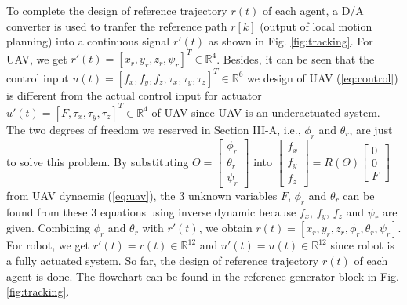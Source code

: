 \documentclass{ieeeaccess}
\begin{document}
To complete the design of reference trajectory $r(t)$ of each agent, a D/A converter is used to tranfer the reference path $r[k]$ (output of local motion planning) into a continuous signal $r'(t)$ as shown in Fig. \ref{fig:tracking}. For UAV, we get $r'(t) = [x_r, y_r, z_r, \psi_r]^T\in\mathbb{R}^{4}$. Besides, it can be seen that the control input $u(t)=[f_x, f_y, f_z, \tau_x, \tau_y, \tau_z]^T\in\mathbb{R}^6$ we design of UAV (\ref{eq:control}) is different from the actual control input for actuator $u'(t)=[F, \tau_x, \tau_y, \tau_z]^T\in\mathbb{R}^4$ of UAV since UAV is an underactuated system. The two degrees of freedom we reserved in Section III-A, i.e., $\phi_r$ and $\theta_r$, are just to solve this problem. By substituting $\Theta=\begin{bmatrix}
    \phi_r \\ \theta_r \\ \psi_r
\end{bmatrix}$ into $\begin{bmatrix}
        f_x \\ f_y \\ f_z
\end{bmatrix} = R(\Theta)\begin{bmatrix}
        0 \\ 0 \\ F
\end{bmatrix} $ from UAV dynacmis (\ref{eq:uav}), the 3 unknown variables $F$, $\phi_r$ and $\theta_r$ can be found from these 3 equations using inverse dynamic because $f_x$, $f_y$, $f_z$ and $\psi_r$ are given. Combining $\phi_r$ and $\theta_r$ with $r'(t)$, we obtain $r(t)= [x_r, y_r, z_r, \phi_r, \theta_r, \psi_r]$. For robot, we get $r'(t)=r(t)\in\mathbb{R}^{12}$ and $u'(t)=u(t)\in\mathbb{R}^{12}$ since robot is a fully actuated system. So far, the design of reference trajectory $r(t)$ of each agent is done. The flowchart can be found in the reference generator block in Fig. \ref{fig:tracking}.
\end{document}
